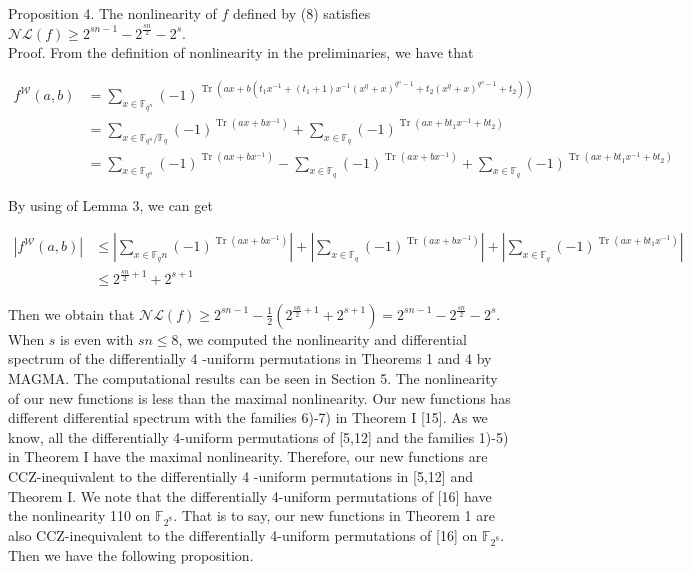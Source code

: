 \documentclass[10pt]{article}
\begin{document}
Proposition 4. The nonlinearity of $f$ defined by (8) satisfies $\mathcal{N} \mathcal{L}(f) \geqslant 2^{s n-1}-2^{\frac{s n}{2}}-2^{s}$.\\
Proof. From the definition of nonlinearity in the preliminaries, we have that

$$
\begin{aligned}
f^{\mathcal{W}}(a, b) & =\sum_{x \in \mathbb{F}_{q^{n}}}(-1)^{\operatorname{Tr}\left(a x+b\left(t_{1} x^{-1}+\left(t_{1}+1\right) x^{-1}\left(x^{q}+x\right)^{q^{n}-1}+t_{2}\left(x^{q}+x\right)^{q^{n}-1}+t_{2}\right)\right)} \\
& =\sum_{x \in \mathbb{F}_{q^{n}} / \mathbb{F}_{q}}(-1)^{\operatorname{Tr}\left(a x+b x^{-1}\right)}+\sum_{x \in \mathbb{F}_{q}}(-1)^{\operatorname{Tr}\left(a x+b t_{1} x^{-1}+b t_{2}\right)} \\
& =\sum_{x \in \mathbb{F}_{q^{n}}}(-1)^{\operatorname{Tr}\left(a x+b x^{-1}\right)}-\sum_{x \in \mathbb{F}_{q}}(-1)^{\operatorname{Tr}\left(a x+b x^{-1}\right)}+\sum_{x \in \mathbb{F}_{q}}(-1)^{\operatorname{Tr}\left(a x+b t_{1} x^{-1}+b t_{2}\right)}
\end{aligned}
$$

By using of Lemma 3, we can get

$$
\begin{aligned}
\left|f^{\mathcal{W}}(a, b)\right| & \leqslant\left|\sum_{x \in \mathbb{F}_{q} n}(-1)^{\operatorname{Tr}\left(a x+b x^{-1}\right)}\right|+\left|\sum_{x \in \mathbb{F}_{q}}(-1)^{\operatorname{Tr}\left(a x+b x^{-1}\right)}\right|+\left|\sum_{x \in \mathbb{F}_{q}}(-1)^{\operatorname{Tr}\left(a x+b t_{1} x^{-1}\right)}\right| \\
& \leqslant 2^{\frac{s n}{2}+1}+2^{s+1}
\end{aligned}
$$

Then we obtain that $\mathcal{N} \mathcal{L}(f) \geqslant 2^{s n-1}-\frac{1}{2}\left(2^{\frac{s n}{2}+1}+2^{s+1}\right)=2^{s n-1}-2^{\frac{s n}{2}}-2^{s}$.\\
When $s$ is even with $s n \leqslant 8$, we computed the nonlinearity and differential spectrum of the differentially 4 -uniform permutations in Theorems 1 and 4 by MAGMA. The computational results can be seen in Section 5. The nonlinearity of our new functions is less than the maximal nonlinearity. Our new functions has different differential spectrum with the families 6)-7) in Theorem I [15]. As we know, all the differentially 4-uniform permutations of [5,12] and the families 1)-5) in Theorem I have the maximal nonlinearity. Therefore, our new functions are CCZ-inequivalent to the differentially 4 -uniform permutations in [5,12] and Theorem I. We note that the differentially 4-uniform permutations of [16] have the nonlinearity 110 on $\mathbb{F}_{2^{8}}$. That is to say, our new functions in Theorem 1 are also CCZ-inequivalent to the differentially 4-uniform permutations of [16] on $\mathbb{F}_{2^{8}}$. Then we have the following proposition.
\end{document}
